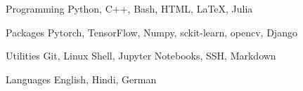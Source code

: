 

\begin{cvskills}

  \cvskill
    {Programming} %
    {Python, C++, Bash, HTML, \LaTeX, Julia} %

  \cvskill
    {Packages} %
    {Pytorch, TensorFlow, Numpy, sckit-learn, opencv, Django} %
    

  \cvskill
    {Utilities} %
    {Git, Linux Shell, Jupyter Notebooks, SSH, Markdown} %


  \cvskill
{Languages} %
{English, Hindi, German} %




\end{cvskills}